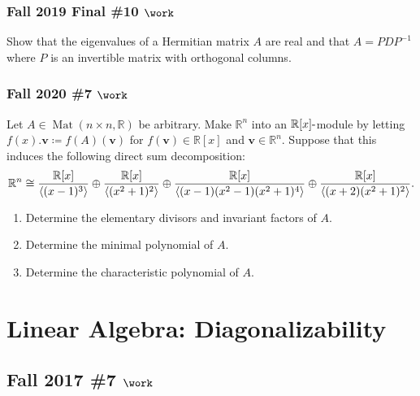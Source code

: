 \hypertarget{fall-2019-final-10-work}{%
\subsubsection{\texorpdfstring{Fall 2019 Final \#10
\(\work\)}{Fall 2019 Final \#10 \textbackslash work}}\label{fall-2019-final-10-work}}

Show that the eigenvalues of a Hermitian matrix \(A\) are real and that
\(A = PDP^{-1}\) where \(P\) is an invertible matrix with orthogonal
columns.

\hypertarget{fall-2020-7-work}{%
\subsubsection{\texorpdfstring{Fall 2020 \#7
\(\work\)}{Fall 2020 \#7 \textbackslash work}}\label{fall-2020-7-work}}

Let \(A \in \operatorname{Mat}(n\times n, {\mathbb{R}})\) be arbitrary.
Make \({\mathbb{R}}^n\) into an \({\mathbb{R}}[x]{\hbox{-}}\)module by
letting \(f(x).\mathbf{v} \coloneqq f(A)(\mathbf{v})\) for
\(f(\mathbf{v})\in {\mathbb{R}}[x]\) and
\(\mathbf{v} \in {\mathbb{R}}^n\). Suppose that this induces the
following direct sum decomposition:
\begin{align*}
{\mathbb{R}}^n \cong
{ {\mathbb{R}}[x] \over \left\langle{ (x-1)^3 }\right\rangle }
\oplus
{ {\mathbb{R}}[x] \over \left\langle{ (x^2+1)^2 }\right\rangle }
\oplus
{ {\mathbb{R}}[x] \over \left\langle{ (x-1)(x^2-1)(x^2+1)^4 }\right\rangle }
\oplus
{ {\mathbb{R}}[x] \over \left\langle{ (x+2)(x^2+1)^2 }\right\rangle }
.\end{align*}

\begin{enumerate}
\def\labelenumi{\alph{enumi}.}
\item
  Determine the elementary divisors and invariant factors of \(A\).
\item
  Determine the minimal polynomial of \(A\).
\item
  Determine the characteristic polynomial of \(A\).
\end{enumerate}

\hypertarget{linear-algebra-diagonalizability}{%
\section{Linear Algebra:
Diagonalizability}\label{linear-algebra-diagonalizability}}

\hypertarget{fall-2017-7-work}{%
\subsection{\texorpdfstring{Fall 2017 \#7
\(\work\)}{Fall 2017 \#7 \textbackslash work}}\label{fall-2017-7-work}}

